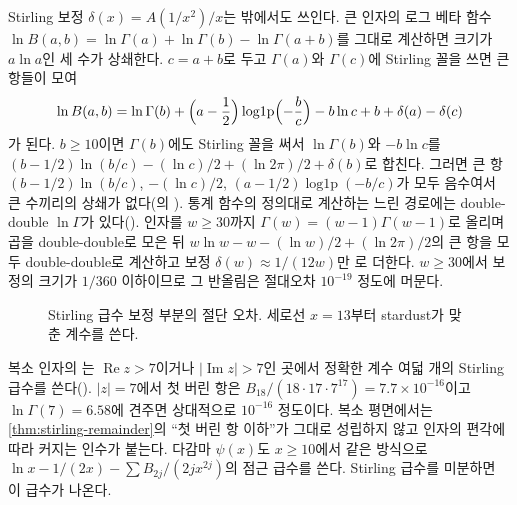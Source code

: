 Stirling 보정 $\delta(x)=A(1/x^2)/x$는  밖에서도 쓰인다. 큰 인자의 로그 베타 함수 $\ln B(a,b)=\ln\Gamma(a)+\ln\Gamma(b)-\ln\Gamma(a+b)$를 그대로 계산하면 크기가 $a\ln a$인 세 수가 상쇄한다. $c=a+b$로 두고 $\Gamma(a)$와 $\Gamma(c)$에 Stirling 꼴을 쓰면 큰 항들이 모여
\[
\ln B(a,b)=\ln\Gamma(b)+\Bigl(a-\frac12\Bigr)\operatorname{log1p}\Bigl(-\frac bc\Bigr)-b\ln c+b+\delta(a)-\delta(c)
\]
가 된다. $b\ge10$이면 $\Gamma(b)$에도 Stirling 꼴을 써서 $\ln\Gamma(b)$와 $-b\ln c$를 $(b-1/2)\ln(b/c)-(\ln c)/2+(\ln2\pi)/2+\delta(b)$로 합친다. 그러면 큰 항 $(b-1/2)\ln(b/c)$, $-(\ln c)/2$, $(a-1/2)\operatorname{log1p}(-b/c)$가 모두 음수여서 큰 수끼리의 상쇄가 없다(의 ). 통계 함수의 정의대로 계산하는 느린 경로에는 double-double $\ln\Gamma$가 있다(). 인자를 $w\ge30$까지 $\Gamma(w)=(w-1)\Gamma(w-1)$로 올리며 곱을 double-double로 모은 뒤 $w\ln w-w-(\ln w)/2+(\ln2\pi)/2$의 큰 항을 모두 double-double로 계산하고 보정 $\delta(w)\approx1/(12w)$만 로 더한다. $w\ge30$에서 보정의 크기가 $1/360$ 이하이므로 그 반올림은 절대오차 $10^{-19}$ 정도에 머문다.

\begin{figure}[htbp]
\centering
{}
\caption{Stirling 급수 보정 부분의 절단 오차. 세로선 $x=13$부터 stardust가 맞춘 계수를 쓴다.}
\label{fig:stirling-err}
\end{figure}

복소 인자의 는 $\operatorname{Re}z>7$이거나 $|\operatorname{Im}z|>7$인 곳에서 정확한 계수 여덟 개의 Stirling 급수를 쓴다(). $|z|=7$에서 첫 버린 항은 $B_{18}/(18\cdot17\cdot7^{17})=7.7\times10^{-16}$이고 $\ln\Gamma(7)=6.58$에 견주면 상대적으로 $10^{-16}$ 정도이다. 복소 평면에서는 \cref{thm:stirling-remainder}의 ``첫 버린 항 이하''가 그대로 성립하지 않고 인자의 편각에 따라 커지는 인수가 붙는다\cite{dlmf}. 다감마 $\psi(x)$도 $x\ge10$에서 같은 방식으로 $\ln x-1/(2x)-\sum B_{2j}/(2jx^{2j})$의 점근 급수를 쓴다. Stirling 급수를 미분하면 이 급수가 나온다.


